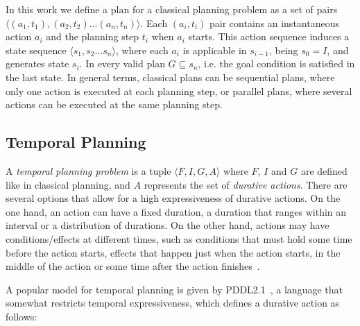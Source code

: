 \documentclass[runningheads]{llncs}
\newcommand{\tup}[1]{{\langle #1 \rangle}}
\begin{document}
In this work we define a plan for a classical planning problem as a set of pairs $\tup{(a_1,t_1),(a_2,t_2)\ldots (a_n,t_n)}$. Each $(a_i,t_i)$ pair contains an instantaneous action $a_i$ and the planning step $t_i$ when $a_i$ starts.
This action sequence induces a state sequence $\tup{s_1,s_2\ldots s_n}$, where each $a_i$ is applicable in $s_{i-1}$, being $s_0=I$, and generates state $s_i$. In every valid plan $G\subseteq s_n$, i.e. the goal condition is satisfied in the last state.
In general terms, classical plans can be sequential plans, where only one action is executed at each planning step, or parallel plans, where several actions can be executed at the same planning step.




\subsection{Temporal Planning}
\label{sec:temporalplanning}

A {\em temporal planning problem} is a tuple $\tup{F,I,G,A}$ where $F$, $I$ and $G$ are defined like in classical planning, and $A$ represents the set of {\em durative actions}. There are several options that allow for a high expressiveness of durative actions. On the one hand, an action can have a fixed duration, a duration that ranges within an interval or a distribution of durations. On the other hand, actions may have conditions/effects at different times, such as conditions that must hold some time before the action starts, effects that happen just when the action starts, in the middle of the action or some time after the action finishes~\cite{garrido2009constraint}.

A popular model for temporal planning is given by PDDL2.1~\cite{fox2003pddl2}, a language that somewhat restricts temporal expressiveness, which defines a durative action as follows:
\end{document}
